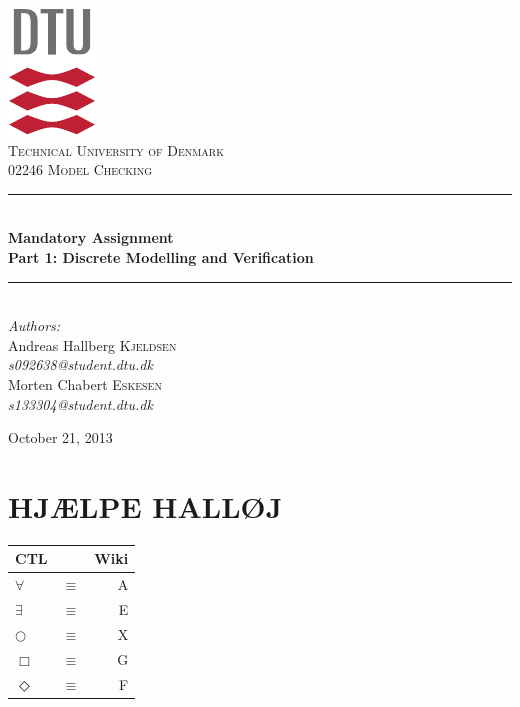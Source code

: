 \documentclass[12pt]{report}
\newcommand{\HRule}{\rule{\linewidth}{0.5mm}}
\begin{document}
\begin{titlepage}
\begin{center}

\includegraphics[scale=2.0]{../GFX/dtu_logo.pdf}\\[1cm]

\textsc{\LARGE Technical University of Denmark}\\[1.5cm]

\textsc{\Large 02246 Model Checking}\\[0.5cm]


\HRule \\[0.4cm]
{\huge \bfseries Mandatory Assignment\\Part 1: Discrete Modelling and Verification}\\[0.1cm]
\HRule \\[1.5cm]

\large
\emph{Authors:}
\\[10pt]
Andreas Hallberg \textsc{Kjeldsen}\\
\emph{s092638@student.dtu.dk}
\\[10pt]
Morten Chabert \textsc{Eskesen}\\
\emph{s133304@student.dtu.dk}

\vfill

{\large October 21, 2013}

\end{center}
\end{titlepage}

\chapter*{HJ{\AE}LPE HALL{\O}J}
\begin{tabular}{ | l  c  r | }
	\hline
	CTL	& & Wiki \\ \hline
	$\forall$ & $\equiv$ &  A \\
	$\exists$ & $\equiv$ & E \\
	$\bigcirc$ & $\equiv$ & X \\
	$\Box$ & $\equiv$ & G \\
	$\Diamond$ & $\equiv$ & F \\
	\hline
\end{tabular}
\newpage
\end{document}
